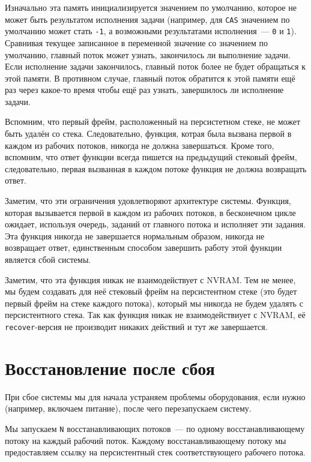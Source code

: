 \documentclass[times,specification,annotation]{itmo-student-thesis}
\begin{document}
Изначально эта память инициализируется значением по умолчанию, которое не может быть результатом исполнения задачи (например, для \texttt{CAS} значением по умолчанию может стать \texttt{-1}, а возможными результатами исполнения~--- \texttt{0} и \texttt{1}). Сравнивая текущее записанное в переменной значение со значением по умолчанию, главный поток может узнать, закончилось ли выполнение задачи. Если исполнение задачи закончилось, главный поток более не будет обращаться к этой памяти. В противном случае, главный поток обратится к этой памяти ещё раз через какое-то время чтобы ещё раз узнать, завершилось ли исполнение задачи.

Вспомним, что первый фрейм, расположенный на персистетном стеке, не может быть удалён со стека. Следовательно, функция, котрая была вызвана первой в каждом из рабочих потоков, никогда не должна завершаться. Кроме того, вспомним, что ответ функции всегда пишется на предыдущий стековый фрейм, следовательно, первая вызванная в каждом потоке функция не должна возвращать ответ.

Заметим, что эти ограничения удовлетворяют архитектуре системы. Функция, которая вызывается первой в каждом из рабочих потоков, в бесконечном цикле ожидает, используя очередь, заданий от главного потока и исполняет эти задания. Эта функция никогда не завершается нормальным образом, никогда не возвращает ответ, единственным способом завершить работу этой функции является сбой системы.

Заметим, что эта функция никак не взаимодействует с NVRAM. Тем не менее, мы будем создавать для неё стековый фрейм на персистентном стеке (это будет первый фрейм на стеке каждого потока), который мы никогда не будем удалять с персистентного стека. Так как функция никак не взаимодействиует с NVRAM, её \texttt{recover}-версия не производит никаких действий и тут же завершается.

\section{Восстановление после сбоя}

При сбое системы мы для начала устраняем проблемы оборудования, если нужно (например, включаем питание), после чего перезапускаем систему.

Мы запускаем \texttt{N} восстанавливающих потоков~--- по одному восстанавливающему потоку на каждый рабочий поток. Каждому восстанавливающему потоку мы предоставляем ссылку на персистентный стек соответствующего рабочего потока.
\end{document}
